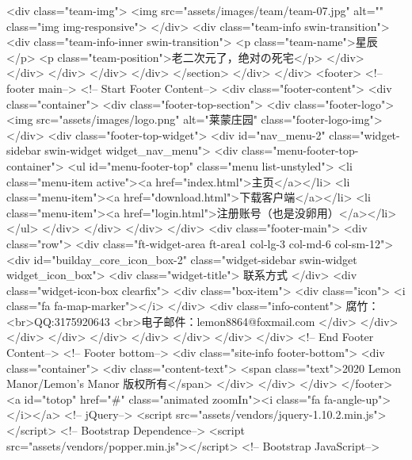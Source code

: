         <div class="team-img">
         <img src="assets/images/team/team-07.jpg" alt="" class="img img-responsive">
        </div> 
        <div class="team-info swin-transition"> 
         <div class="team-info-inner swin-transition"> 
          <p class="team-name">星辰</p> 
          <p class="team-position">老二次元了，绝对の死宅</p> 
         </div> 
        </div> 
       </div> 
      </div> 
     </div> 
    </section> 
   </div> 
  </div> 
  <footer> 
   <!-- footer main--> 
   <!-- Start Footer Content--> 
   <div class="footer-content"> 
    <div class="container"> 
     <div class="footer-top-section"> 
      <div class="footer-logo">
       <img src="assets/images/logo.png" alt="莱蒙庄园" class="footer-logo-img">
      </div> 
      <div class="footer-top-widget"> 
       <div id="nav_menu-2" class="widget-sidebar swin-widget widget_nav_menu"> 
        <div class="menu-footer-top-container"> 
         <ul id="menu-footer-top" class="menu list-unstyled"> 
          <li class="menu-item active"><a href="index.html">主页</a></li> 
          <li class="menu-item"><a href="download.html">下载客户端</a></li> 
          <li class="menu-item"><a href="login.html">注册账号（也是没卵用）</a></li>  
         </ul> 
        </div> 
       </div> 
      </div> 
     </div> 
     <div class="footer-main"> 
      <div class="row"> 
       <div class="ft-widget-area ft-area1 col-lg-3 col-md-6 col-sm-12"> 
        <div id="builday_core_icon_box-2" class="widget-sidebar swin-widget widget_icon_box"> 
         <div class="widget-title">
          联系方式
         </div> 
         <div class="widget-icon-box clearfix"> 
          <div class="box-item"> 
           <div class="icon">
            <i class="fa fa-map-marker"></i>
           </div> 
           <div class="info-content">
            腐竹：
            <br>QQ:3175920643
            <br>电子邮件：lemon8864@foxmail.com 
           </div> 
          </div> 
         </div> 
        </div> 
       </div> 
      </div> 
     </div> 
    </div> 
   </div>    
   <!-- End Footer Content--> 
   <!-- Footer bottom--> 
   <div class="site-info footer-bottom"> 
    <div class="container"> 
     <div class="content-text">
      <span class="text">2020 Lemon Manor/Lemon's Manor 版权所有</span>
     </div> 
    </div> 
   </div> 
  </footer>
  <a id="totop" href="#" class="animated zoomIn"><i class="fa fa-angle-up"></i></a>   
  <!-- jQuery--> 
  <script src="assets/vendors/jquery-1.10.2.min.js"></script> 
  <!-- Bootstrap Dependence--> 
  <script src="assets/vendors/popper.min.js"></script> 
  <!-- Bootstrap JavaScript--> 
